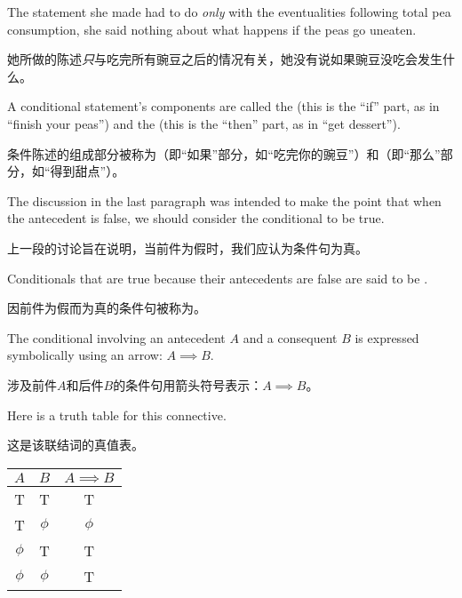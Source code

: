 The statement she made had to do {\em only} with the eventualities
following total pea consumption, she said nothing about what happens
if the peas go uneaten.

她所做的陈述{\em 只}与吃完所有豌豆之后的情况有关，她没有说如果豌豆没吃会发生什么。

A conditional statement's components are called the 
(this is the ``if'' part, as in ``finish
your peas'') and the  (this is the ``then'' part, as in
``get dessert'').

条件陈述的组成部分被称为（即“如果”部分，如“吃完你的豌豆”）和（即“那么”部分，如“得到甜点”）。

The discussion in the 
last paragraph was intended to make the point that when the antecedent
is false, we should consider the conditional to be true.

上一段的讨论旨在说明，当前件为假时，我们应认为条件句为真。

Conditionals
that are true because their antecedents are false are said to
be .

因前件为假而为真的条件句被称为。

The conditional 
involving an antecedent $A$
and a consequent $B$ is expressed symbolically using an arrow: 
$A \implies B$.

涉及前件$A$和后件$B$的条件句用箭头符号表示：$A \implies B$。

Here is a truth table for this connective.

这是该联结词的真值表。

\begin{center}
\begin{tabular}{c|c||c}
\; $A$ \; & \; $B$ \; & \; $A \implies B$ \; \\ \hline
T & T & T \\
T & $\phi$ & $\phi$\\
 $\phi$ & T & T \\
 $\phi$ &  $\phi$ & T\\
\end{tabular}
\end{center}

